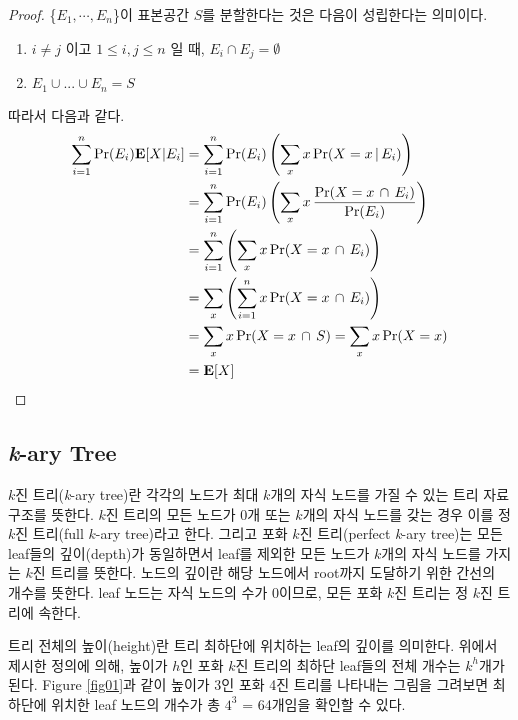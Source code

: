 \documentclass[11pt]{article}
\begin{document}
\singlespacing
\begin{proof}
\{$E_{1}, \cdots , E_{n}$\}이 표본공간 $S$를 분할한다는 것은 다음이 성립한다는 의미이다.
\begin{enumerate}
    \item $i \neq j$ 이고 $1 \le i,j \le n$ 일 때, $E_{i} \cap E_{j} = \emptyset$
    \item $E_{1} \cup ... \cup E_{n} = S$
\end{enumerate}
따라서 다음과 같다.
\[
\begin{split}
\sum_{i=1}^{n} \textnormal{Pr}(E_{i})\textbf{E}[X|E_{i}] & = \sum_{i=1}^{n} \textnormal{Pr}(E_{i}) \left(\sum_{x} x\,\textnormal{Pr}(X = x\,|\,E_{i})\right)\\
& = \sum_{i=1}^{n} \textnormal{Pr}(E_{i}) \left(\sum_{x} x\,\frac{\textnormal{Pr}(X = x\,\cap\,E_{i})}{\textnormal{Pr}(E_{i})}\right)\\
& = \sum_{i=1}^{n} \left(\sum_{x} x\,\textnormal{Pr}(X = x\,\cap\,E_{i})\right)\\
& = \sum_{x} \left(\sum_{i=1}^{n} x\,\textnormal{Pr}(X = x\,\cap\,E_{i})\right)\\
& = \sum_{x} x\,\textnormal{Pr}(X = x\,\cap\,S) = \sum_{x} x\,\textnormal{Pr}(X = x)\\
& = \textbf{E}[X]
\end{split}
\]
\end{proof}
\doublespacing

\subsection{\textit{k}-ary Tree}
$k$진 트리(\textit{k}-ary tree)란 각각의 노드가 최대 $k$개의 자식 노드를 가질 수 있는 트리 자료구조를 뜻한다. $k$진 트리의 모든 노드가 0개 또는 $k$개의 자식 노드를 갖는 경우 이를 정 $k$진 트리(full $k$-ary tree)라고 한다. 그리고 포화 $k$진 트리(perfect \textit{k}-ary tree)는 모든 leaf들의 깊이(depth)가 동일하면서 leaf를 제외한 모든 노드가 $k$개의 자식 노드를 가지는 $k$진 트리를 뜻한다. 노드의 깊이란 해당 노드에서 root까지 도달하기 위한 간선의 개수를 뜻한다. leaf 노드는 자식 노드의 수가 0이므로, 모든 포화 $k$진 트리는 정 $k$진 트리에 속한다.

트리 전체의 높이(height)란 트리 최하단에 위치하는 leaf의 깊이를 의미한다. 위에서 제시한 정의에 의해, 높이가 $h$인 포화 $k$진 트리의 최하단 leaf들의 전체 개수는 $k^h$개가 된다. Figure \ref{fig01}과 같이 높이가 3인 포화 4진 트리를 나타내는 그림을 그려보면 최하단에 위치한 leaf 노드의 개수가 총 $4^3$ = 64개임을 확인할 수 있다.
\end{document}
